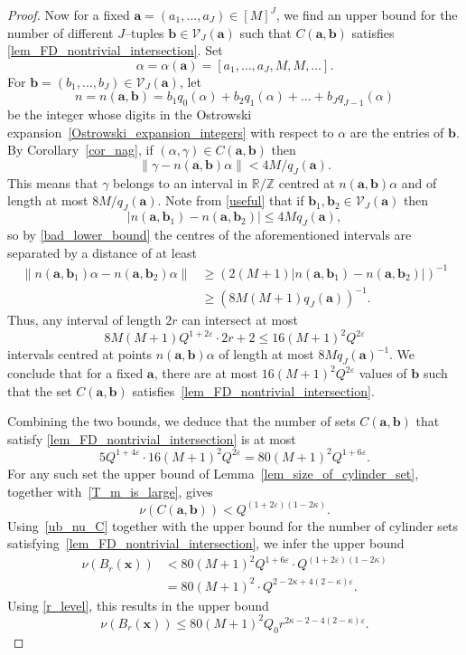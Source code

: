 \documentclass[12pt, reqno]{amsart}
\theoremstyle{definition}
\theoremstyle{remark}
\numberwithin{equation}{section}
\def\kap{{\kappa}}
\def\le{\leqslant} \def\ge{\geqslant}
\def\ls{\leqslant} \def\gs{\geqslant}
\def \bR {\mathbb R}
\def \bZ {\mathbb Z}
\def \ba {\mathbf a}
\def \bb {\mathbf b}
\def \bx {\mathbf x}
\def \cV {\mathcal V}
\begin{document}
\begin{proof}
Now for a fixed $\ba= (a_1, \ldots, a_{J}) \in [M]^{J}$, we find an upper bound for the number of different $J$--tuples $\bb\in \cV_{J}(\ba)$ such that $C(\ba,\bb)$ satisfies \eqref{lem_FD_nontrivial_intersection}. Set $$\alpha=\alpha(\ba) = [a_1,\ldots, a_{J}, M, M, \ldots].$$ 
For $\bb = (b_1, \ldots, b_{J}) \in \cV_{J}(\ba)$,  let 
\[ n = n(\ba,\bb) =  b_{1}q_0(\alpha) + b_2q_1(\alpha) + \ldots + b_{J}q_{J-1}(\alpha) \]
be the integer whose digits in the  Ostrowski expansion~\eqref{Ostrowski_expansion_integers} with respect to $\alpha$ are the entries of $\bb$. By Corollary~\ref{cor_nag},
if $(\alpha,\gamma) \in C(\ba,\bb)$ then
\[
\|\gamma-n(\ba,\bb)\alpha\| < 4M/ q_{J}(\ba). 
\]
This means that $\gamma$ belongs to an interval in $\bR/\bZ$ centred at $n(\ba,\bb)\alpha$ and of length at most $8 M/q_{J}(\ba)$. Note from 
\eqref{useful} that if $\bb_1, \bb_2 \in \cV_{J}(\ba)$ then
\[
|n(\ba,\bb_1)-n(\ba,\bb_2)|
\le 4M q_{J}(\ba),
\]
so by \eqref{bad_lower_bound} the centres of the aforementioned intervals are separated by a distance of at least 
\begin{align*} \|n(\ba,\bb_1)\alpha-n(\ba,\bb_2)\alpha\| &\gs  (2(M+1)|n(\ba,\bb_1)-n(\ba,\bb_2)|)^{-1}\\  
& \ge \left(8M(M+1) q_{J}(\ba)\right)^{-1}.
\end{align*}
Thus, any interval of length $2r$ can intersect at most
\[  
8M(M+1) Q^{1+2\varepsilon}\cdot 2r+2 \ls 16 (M+1)^2Q^{2\varepsilon}  
\]
intervals centred at points $n(\ba,\bb)\alpha$ of length at most $8 M q_{J}(\ba)^{-1}$. We conclude that for a fixed $\ba$, there are at most $16 (M+1)^2 Q^{2\varepsilon}$ values of $\bb$ such that the set $C(\ba,\bb)$ satisfies~\eqref{lem_FD_nontrivial_intersection}.

Combining the two bounds, we deduce that the number of sets $C(\ba,\bb)$ that satisfy \eqref{lem_FD_nontrivial_intersection} is at most  
\[
5Q^{1+4\varepsilon}\cdot 16 (M+1)^2 Q^{2\varepsilon} = 80 (M+1)^2 Q^{1+6\varepsilon}.
\] 
For any such set the upper bound of Lemma~\ref{lem_size_of_cylinder_set}, together with~\eqref{T_m_is_large}, gives  
\begin{equation} \label{ub_nu_C}
\nu(C(\ba,\bb)) 
< Q^{(1+2\varepsilon)
	(1-2\kappa)}.
\end{equation}
Using~\eqref{ub_nu_C} together with the upper bound for the number of cylinder sets satisfying~\eqref{lem_FD_nontrivial_intersection}, we infer the upper bound
\[
\begin{aligned}
\nu\left(B_r(\bx)\right) &< 80 (M+1)^2 Q^{1+6\varepsilon} \cdot  Q^{(1+2\varepsilon)(1-2\kappa)}  \\
&= 80 (M+1)^2 \cdot  Q^{2-2\kappa+4(2-\kappa)\varepsilon}.
\end{aligned}
\]
Using \eqref{r_level}, this results in the upper bound
\[        \nu\left(B_r(\bx)\right) \le 80 (M+1)^2 Q_0
r^{2\kappa-2-4(2-\kap)\varepsilon}.
\]
\end{proof}
\end{document}
